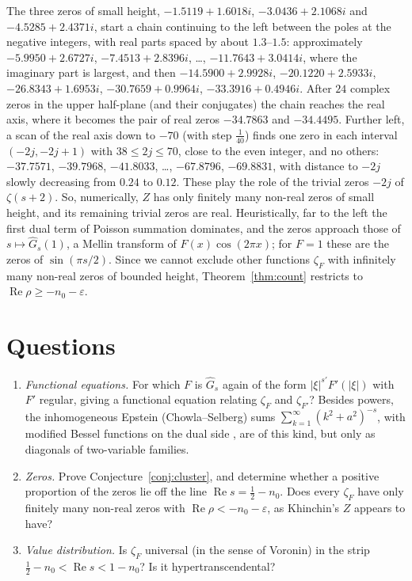 \documentclass[11pt,reqno]{amsart}
\theoremstyle{definition}
\theoremstyle{remark}
\begin{document}
The three zeros of small height, $-1.5119 + 1.6018i$, $-3.0436 + 2.1068i$ and $-4.5285 + 2.4371i$, start a chain
continuing to the left between the poles at the negative integers, with real parts spaced by about $1.3$--$1.5$:
approximately $-5.9950 + 2.6727i$, $-7.4513 + 2.8396i$, \dots, $-11.7643 + 3.0414i$, where the imaginary part is
largest, and then $-14.5900 + 2.9928i$, $-20.1220 + 2.5933i$, $-26.8343 + 1.6953i$, $-30.7659 + 0.9964i$,
$-33.3916 + 0.4946i$. After $24$ complex zeros in the upper half-plane (and their conjugates) the chain reaches the real axis, where it
becomes the pair of real zeros $-34.7863$ and $-34.4495$. Further left, a scan of the real axis down to $-70$ (with step $\frac1{40}$) finds
one zero in each interval $(-2j, -2j+1)$ with $38 \le 2j \le 70$, close to the even integer, and no others: $-37.7571$, $-39.7968$, $-41.8033$, \dots,
$-67.8796$, $-69.8831$, with distance to $-2j$ slowly decreasing from $0.24$ to $0.12$. These play the role of the
trivial zeros $-2j$ of $\zeta(s+2)$. So, numerically, $Z$ has only finitely many non-real zeros of small height, and
its remaining trivial zeros are real. Heuristically, far to the left the first dual term of Poisson summation
dominates, and the zeros approach those of $s \mapsto \widehat G_s(1)$, a Mellin transform of $F(x)\cos(2\pi x)$; for
$F = 1$ these are the zeros of $\sin(\pi s/2)$. Since we cannot exclude other functions $\zeta_F$ with infinitely
many non-real zeros of bounded height, Theorem~\ref{thm:count} restricts to $\operatorname{Re}\rho \ge -n_0-\varepsilon$.

\section{Questions}
\begin{enumerate}
\item \emph{Functional equations.} For which $F$ is $\widehat G_s$ again of the form $|\xi|^{s'}F'(|\xi|)$ with
$F'$ regular, giving a functional equation relating $\zeta_F$ and $\zeta_{F'}$? Besides powers, the inhomogeneous
Epstein (Chowla--Selberg) sums $\sum_{k=1}^{\infty}(k^2+a^2)^{-s}$, with modified Bessel functions on the dual side
\cite{CS67,BGMWZ13}, are of this kind, but only as diagonals of two-variable families.
\item \emph{Zeros.} Prove Conjecture~\ref{conj:cluster}, and determine whether a positive proportion of the zeros
lie off the line $\operatorname{Re}s = \frac12-n_0$. Does every $\zeta_F$ have only finitely many non-real zeros with $\operatorname{Re}\rho < -n_0-\varepsilon$, as
Khinchin's $Z$ appears to have?
\item \emph{Value distribution.} Is $\zeta_F$ universal (in the sense of Voronin) in the strip
$\frac12 - n_0 < \operatorname{Re}s < 1 - n_0$? Is it hypertranscendental?
\end{enumerate}
\end{document}
